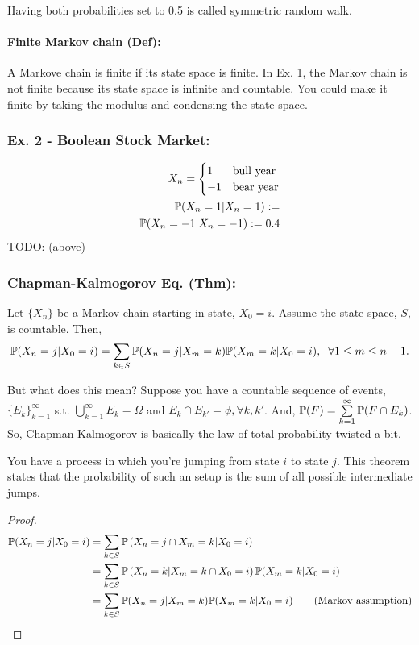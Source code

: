Having both probabilities set to 0.5 is called symmetric random walk. 

\paragraph*{Finite Markov chain (Def): }A Markove chain is finite if its state space is finite. In Ex. 1, the Markov chain is not finite because its state space is infinite and countable. You could make it finite by taking the modulus and condensing the state space. 

\subsubsection*{Ex. 2 - Boolean Stock Market: }
\[
\begin{aligned}
	X_n = 
		\begin{cases}
		1 & \text{bull year} \\
		-1 & \text{bear year} 
		\end{cases}	\\
	\mathbb{P}(X_n = 1 | X_n = 1) := \\
	\mathbb{P}(X_n = -1  | X_n = -1 ) := 0.4
\end{aligned}	
\]
TODO: (above)

\subsubsection*{Chapman-Kalmogorov Eq. (Thm): } 
Let $\{ X_n\}$ be a Markov chain starting in state, $X_0 = i$. Assume the state space, $S$, is countable. Then, 
\[ \mathbb{P}( X_n = j | X_0 = i ) 
	= \sum\limits_{k\in S} \mathbb{P}( X_n = j | X_m = k ) \mathbb{P}( X_m = k | X_0 = i ), \;\; \forall 1\leq m \leq n-1. \]

But what does this mean? Suppose you have a countable sequence of events, $\{ E_k \}_{k=1}^\infty$ s.t. $\bigcup_{k=1}^\infty E_k = \Omega$ and $E_k \cap E_{k'} = \phi, \forall k, k'$. And, $\mathbb{P}(F) = \sum\limits_{k=1}^\infty \mathbb{P}( F \cap E_k ) $. So, Chapman-Kalmogorov is basically the law of total probability twisted a bit. 

You have a process in which you're jumping from state $i$ to state $j$. This theorem states that the probability of such an setup is the sum of all possible intermediate jumps. 

\begin{proof}
	\begin{align*}
		\mathbb{P}( X_n = j | X_0 = i) 
			&= \sum\limits_{k\in S} \mathbb{P} \left( X_n = j \cap X_m = k | X_0 = i \right) \\
			&= \sum\limits_{k\in S} \mathbb{P} \left( X_n = k | X_m = k \cap X_0 = i \right) 
				\mathbb{P} (X_m = k | X_0 = i ) \\
			&= \sum\limits_{k\in S} \mathbb{P}( X_n = j | X_m = k ) \mathbb{P}( X_m = k | X_0 = i) \tag{Markov assumption}
	\end{align*}
\end{proof}

